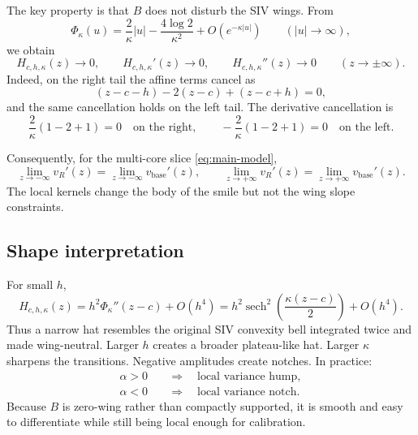 \documentclass[11pt]{article}
\DeclareMathOperator{\sech}{sech}
\begin{document}
The key property is that $B$ does not disturb the SIV wings.  From
\begin{equation}
  \Phi_\kappa(u)=\frac{2}{\kappa}|u|-\frac{4\log 2}{\kappa^2}+O(e^{-\kappa |u|})
  \qquad (|u|\to\infty),
  \label{eq:Phi-tail}
\end{equation}
we obtain
\begin{equation}
  H_{c,h,\kappa}(z)\to0,
  \qquad
  H_{c,h,\kappa}'(z)\to0,
  \qquad
  H_{c,h,\kappa}''(z)\to0
  \qquad (z\to\pm\infty).
  \label{eq:H-zero-wing}
\end{equation}
Indeed, on the right tail the affine terms cancel as
\begin{equation}
  (z-c-h)-2(z-c)+(z-c+h)=0,
\end{equation}
and the same cancellation holds on the left tail.  The derivative cancellation is
\begin{equation}
  \frac{2}{\kappa}(1-2+1)=0
  \quad\text{on the right},
  \qquad
  -\frac{2}{\kappa}(1-2+1)=0
  \quad\text{on the left}.
\end{equation}

Consequently, for the multi-core slice \eqref{eq:main-model},
\begin{equation}
  \lim_{z\to-\infty}v_R'(z)=\lim_{z\to-\infty}v_{\mathrm{base}}'(z),
  \qquad
  \lim_{z\to+\infty}v_R'(z)=\lim_{z\to+\infty}v_{\mathrm{base}}'(z).
  \label{eq:model-wing-preservation}
\end{equation}
The local kernels change the body of the smile but not the wing slope constraints.

\subsection{Shape interpretation}

For small $h$,
\begin{equation}
  H_{c,h,\kappa}(z)
  =h^2\Phi_\kappa''(z-c)+O(h^4)
  =h^2\sech^2\!\left(\frac{\kappa(z-c)}{2}\right)+O(h^4).
  \label{eq:H-small-h}
\end{equation}
Thus a narrow hat resembles the original SIV convexity bell integrated twice and made wing-neutral.  Larger $h$ creates a broader plateau-like hat.  Larger $\kappa$ sharpens the transitions.  Negative amplitudes create notches.  In practice:
\begin{align*}
  \alpha>0 &\quad\Rightarrow\quad \text{local variance hump},\\
  \alpha<0 &\quad\Rightarrow\quad \text{local variance notch}.
\end{align*}
Because $B$ is zero-wing rather than compactly supported, it is smooth and easy to differentiate while still being local enough for calibration.
\end{document}

